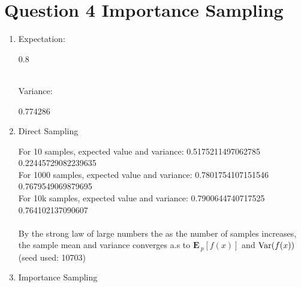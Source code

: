 \documentclass[12pt]{article}
\begin{document}
\section*{Question 4 Importance Sampling}
\begin{enumerate}
     \item 
        Expectation: \begin{tcolorbox}[fit,height=1cm, width=3cm, blank, borderline={1pt}{1pt},nobeforeafter]
        \begin{center}
        \vspace{3mm}
        0.8 
        \end{center}
        \end{tcolorbox} \vspace{5mm}\\
        Variance: \hspace{0.47cm} \begin{tcolorbox}[fit,height=1cm, width=3cm, blank, borderline={1pt}{1pt},nobeforeafter]
            \begin{center}
            \vspace{3mm}
            0.774286 
            \end{center}
            \end{tcolorbox}  
    \item Direct Sampling \vspace{0.3cm} \\
    \begin{tcolorbox}[fit,height=10cm, width=\textwidth, blank, borderline={1pt}{-2pt},nobeforeafter]
For 10 samples, expected value and variance: 0.5175211497062785 0.22445729082239635\\
For 1000 samples, expected value and variance: 0.7801754107151546 0.7679549069879695\\
For 10k samples, expected value and variance: 0.7900644740717525 0.764102137090607\\\\
		By the strong law of large numbers the as the number of samples increases, the sample mean and variance converges a.s to $\mathbf{E}_{~p}[f(x)]$ and ${\rm Var}(f(x))$ (seed used: 10703)\\
    \end{tcolorbox}
    \newpage 
    \item Importance Sampling \vspace{0.3cm} \\
    \begin{tcolorbox}[fit,height=10cm, width=\textwidth, blank, borderline={1pt}{-2pt},nobeforeafter]

\end{tcolorbox}
\end{enumerate}
\end{document}
